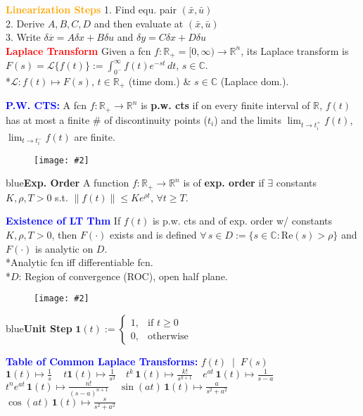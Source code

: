 \documentclass[5pt]{extarticle} %
\newcommand{\customFigure}[3][]{%
    \vspace{-1.5em}
    \begin{figure}[H]
        \centering
        \texttt{[image: \#2]}
    \end{figure}
    \vspace{-1.5em}
}
\begin{document}
\begin{paracol}{3}
{    \textcolor{orange}{\textbf{Linearization Steps}} 1. Find equ. pair $(\bar{x}, \bar{u})$ \\
    2. Derive $A,B,C,D$ and then evaluate at $(\bar{x}, \bar{u})$ \\
    3. Write $\delta \overset{\cdot}{x} = A \delta x + B \delta u$ and $\delta y = C \delta x + D \delta u$ \\

    \textcolor{red}{\textbf{Laplace Transform}} Given a fcn $f: \mathbb{R}_+ = [0,\infty) \to \mathbb{R}^n$, its Laplace transform is 
    $F(s) = \mathcal{L} \{ f(t) \} := \int_{0^-}^{\infty} f(t) e^{-st} \, dt$, $s \in \mathbb{C}$. \\ 
    *$\mathcal{L:} f(t) \mapsto F(s)$, $t \in \mathbb{R}_+$ (time dom.) \& $s \in \mathbb{C}$ (Laplace dom.).
    
    \textcolor{blue}{\textbf{P.W. CTS:}} A fcn $f: \mathbb{R}_+ \to \mathbb{R}^n$ is \textbf{p.w. cts} if on every finite interval of $\mathbb{R}$, $f(t)$ has at most a finite \# of discontinuity points ($t_i$) and the limits 
    $\lim_{t \to t_i^+} f(t)$, $\lim_{t \to t_i^-} f(t)$ are finite.

    \customFigure[0.1]{../Images/L4_0.png}

    \textcolor{blue}{\textbf{Exp. Order}} A function $f: \mathbb{R}_+ \to \mathbb{R}^n$ is of \textbf{exp. order} if $\exists$ constants $K, \rho, T > 0$ s.t. $\|f(t)\| \leq K e^{\rho t}$, $\forall t \geq T$.

    \textcolor{blue}{\textbf{Existence of LT Thm}} If $f(t)$ is p.w. cts and of exp. order w/ constants $K, \rho, T > 0$, then $F(\cdot)$ exists and is defined $\forall \, s \in D := \{s \in \mathbb{C} : \text{Re}(s) > \rho\}$ and $F(\cdot)$ is analytic on $D$. \\
    *Analytic fcn iff differentiable fcn. \\
    *$D$: Region of convergence (ROC), open half plane. \\
    \customFigure[0.1]{../Images/L4_1.png}

    \textcolor{blue}{\textbf{Unit Step}} $\mathbf{1}(t) := 
        \begin{cases} 
        1, & \text{if } t \geq 0 \\ 
        0, & \text{otherwise}
        \end{cases}$

    \textcolor{blue}{\textbf{Table of Common Laplace Transforms:}} $f(t) \; \mid \; F(s)$ \\ 
    $\mathbf{1}(t) \mapsto \frac{1}{s} \, \quad t \mathbf{1}(t) \mapsto \frac{1}{s^2} \quad t^k \, \mathbf{1}(t) \mapsto \frac{k!}{s^{k+1}} \quad e^{at} \, \mathbf{1}(t) \mapsto \frac{1}{s-a}$ \\ 
    $t^n e^{at} \, \mathbf{1}(t) \mapsto \frac{n!}{(s-a)^{n+1}} \quad \sin(at) \, \mathbf{1}(t) \mapsto \frac{a}{s^2 + a^2} \quad $ \\
    $ \cos(at) \, \mathbf{1}(t) \mapsto \frac{s}{s^2 + a^2} $

}
\end{paracol}
\end{document}
